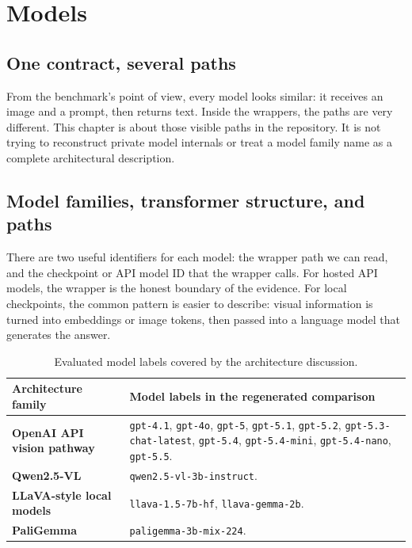 \documentclass[11pt,a4paper]{report}
\newcommand{\code}[1]{\texttt{#1}}
\begin{document}
\clearpage
\chapter{Models}

\section{One contract, several paths}
From the benchmark's point of view, every model looks similar: it receives an
image and a prompt, then returns text.  Inside the wrappers, the paths are very
different.  This chapter is about those visible paths in the repository.  It is
not trying to reconstruct private model internals or treat a model family name
as a complete architectural description.

\section{Model families, transformer structure, and paths}
There are two useful identifiers for each model: the wrapper path we can read,
and the checkpoint or API model ID that the wrapper calls.  For hosted API
models, the wrapper is the honest boundary of the evidence.  For local
checkpoints, the common pattern is easier to describe: visual information is
turned into embeddings or image tokens, then passed into a language model that
generates the answer.

\begin{table}[H]
\centering
\caption{Evaluated model labels covered by the architecture discussion.}
\small
\begin{tabularx}{\textwidth}{>{\bfseries}p{30mm} X}
\toprule
Architecture family & Model labels in the regenerated comparison \\
\midrule
OpenAI API vision pathway &
\code{gpt-4.1}, \code{gpt-4o}, \code{gpt-5}, \code{gpt-5.1},
\code{gpt-5.2}, \code{gpt-5.3-chat-latest}, \code{gpt-5.4},
\code{gpt-5.4-mini}, \code{gpt-5.4-nano}, \code{gpt-5.5}. \\
Qwen2.5-VL &
\code{qwen2.5-vl-3b-instruct}. \\
LLaVA-style local models &
\code{llava-1.5-7b-hf}, \code{llava-gemma-2b}. \\
PaliGemma &
\code{paligemma-3b-mix-224}. \\
\bottomrule
\end{tabularx}
\normalsize
\end{table}
\end{document}
